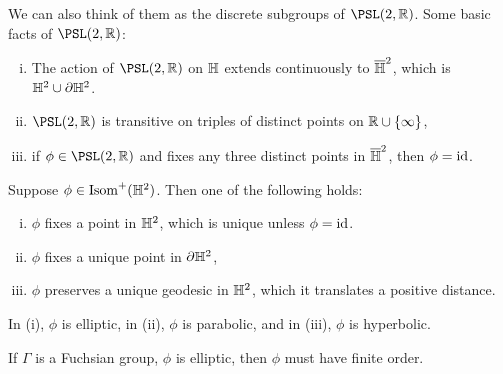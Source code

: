 \documentclass{article}
\begin{document}
We can also think of them as the discrete subgroups of \(\PSL(2, \R)\). Some basic facts of \(\PSL(2, \R)\):

\begin{proposition}
    \begin{enumerate}[(i)]
        \item The action of \(\PSL(2, \R)\) on \(\mathbb{H}\) extends continuously to \(\overline{\mathbb{H}}^2\), which is \(\mathbb{H}^2 \cup \partial \mathbb{H}^2\).
        \item \(\PSL(2, \R)\) is transitive on triples of distinct points on \(\mathbb{R} \cup \{\infty\}\),
        \item if \(\phi \in \PSL(2, \R)\) and fixes any three distinct points in \(\overline{\mathbb{H}}^2\), then \(\phi = \operatorname{id}\). 
    \end{enumerate}
\end{proposition}

\begin{corollary}
     Suppose \(\phi \in \operatorname{Isom}^+(\mathbb{H}^2)\). Then one of the following holds:
    \begin{enumerate}[(i)]
        \item \(\phi\) fixes a point in \(\mathbb{H}^2\), which is unique unless \(\phi = \operatorname{id}\).
        \item \(\phi\) fixes a unique point in \(\partial \mathbb{H}^2\),
        \item \(\phi\) preserves a unique geodesic in \(\mathbb{H}^2\), which it translates a positive distance.
    \end{enumerate}
    In (i), \(\phi\) is elliptic, in (ii), \(\phi\) is parabolic, and in (iii), \(\phi\) is hyperbolic.
\end{corollary}

\begin{remark}
    If \(\Gamma\) is a Fuchsian group, \(\phi\) is elliptic, then \(\phi\) must have finite order. 
\end{remark}

\lec
\end{document}

